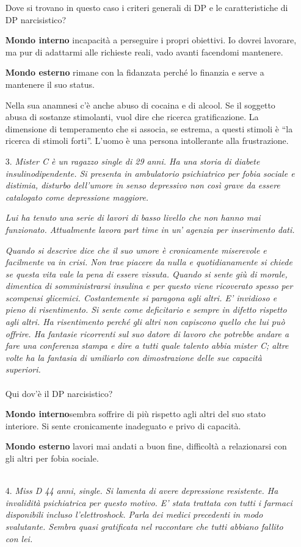 \begin{itemize}
Dove si trovano in questo caso i criteri generali di DP e le
caratteristiche di DP narcisistico?

\textbf{Mondo interno} incapacità a perseguire i propri obiettivi. Io
dovrei lavorare, ma pur di adattarmi alle richieste reali, vado avanti
facendomi mantenere.

\textbf{Mondo esterno} rimane con la fidanzata perché lo finanzia e
serve a mantenere il suo status.

Nella sua anamnesi c'è anche abuso di cocaina e di alcool. Se il
soggetto abusa di sostanze stimolanti, vuol dire che ricerca
gratificazione. La dimensione di temperamento che si associa, se
estrema, a questi stimoli è ``la ricerca di stimoli forti''. L'uomo è
una persona intollerante alla frustrazione.

\item[3.]
  \emph{Mister C è un ragazzo single di 29 anni. Ha una storia di
  diabete insulinodipendente. Si presenta in ambulatorio psichiatrico
  per fobia sociale e distimia, disturbo dell'umore in senso depressivo
  non così grave da essere catalogato come depressione maggiore. }

\emph{Lui ha tenuto una serie di lavori di basso livello che non hanno
mai funzionato. Attualmente lavora part time in un' agenzia per
inserimento dati. }

\emph{Quando si descrive dice che il suo umore è cronicamente miserevole
e facilmente va in crisi. Non trae piacere da nulla e quotidianamente si
chiede se questa vita vale la pena di essere vissuta. Quando si sente
giù di morale, dimentica di somministrarsi insulina e per questo viene
ricoverato spesso per scompensi glicemici. Costantemente si paragona
agli altri. E' invidioso e pieno di risentimento. Si sente come
deficitario e sempre in difetto rispetto agli altri. Ha risentimento
perché gli altri non capiscono quello che lui può offrire. Ha fantasie
ricorrenti sul suo datore di lavoro che potrebbe andare a fare una
conferenza stampa e dire a tutti quale talento abbia mister C; altre
volte ha la fantasia di umiliarlo con dimostrazione delle sue capacità
superiori.}
\\\\
Qui dov'è il DP narcisistico?

\textbf{Mondo interno}sembra soffrire di più rispetto agli altri del suo
stato interiore. Si sente cronicamente inadeguato e privo di capacità.

\textbf{Mondo esterno} lavori mai andati a buon fine, difficoltà a
relazionarsi con gli altri per fobia sociale.
\\\\
\item[4.]
  \emph{Miss D 44 anni, single. Si lamenta di avere depressione
  resistente. Ha invalidità psichiatrica per questo motivo. E' stata
  trattata con tutti i farmaci disponibili incluso l'elettroshock. Parla
  dei medici precedenti in modo svalutante. Sembra quasi gratificata nel
  raccontare che tutti abbiano fallito con lei. }


\end{itemize}
